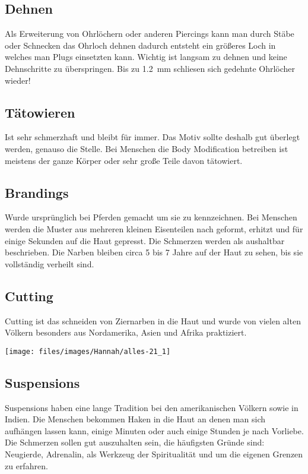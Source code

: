 \subsection{Dehnen}
Als Erweiterung von Ohrlöchern oder anderen Piercings kann man durch Stäbe oder Schnecken das Ohrloch
dehnen dadurch entsteht ein größeres Loch in welches man Plugs einsetzten kann. Wichtig ist langsam
zu dehnen und keine Dehnschritte zu überspringen. Bis zu \SI{1,2}{\milli\metre} schliesen sich
gedehnte Ohrlöcher wieder!

\subsection{Tätowieren}
Ist sehr schmerzhaft und bleibt für immer. Das Motiv sollte deshalb gut überlegt werden, genauso die
Stelle. Bei Menschen die Body Modification betreiben ist meistens der ganze Körper oder sehr große
Teile davon tätowiert.

\subsection{Brandings}
Wurde ursprünglich bei Pferden gemacht um sie zu kennzeichnen. Bei Menschen werden die Muster aus
mehreren kleinen Eisenteilen nach geformt, erhitzt und für einige Sekunden auf die Haut gepresst. Die
Schmerzen werden als aushaltbar beschrieben. Die Narben bleiben circa 5 bis 7 Jahre auf der Haut zu
sehen, bis sie vollständig verheilt sind.

\subsection{Cutting}
Cutting ist das schneiden von Ziernarben in die Haut und wurde von vielen alten Völkern besonders aus
Nordamerika, Asien und Afrika praktiziert.

\begin{figurewrapper}
	\texttt{[image: files/images/Hannah/alles-21\_1]}%
\end{figurewrapper}

\subsection{Suspensions}
Suspensions haben eine lange Tradition bei den amerikanischen Völkern sowie in Indien. Die Menschen
bekommen Haken in die Haut an denen man sich aufhängen lassen kann, einige Minuten oder auch einige
Stunden je nach Vorliebe. Die Schmerzen sollen gut auszuhalten sein, die häufigsten Gründe sind:
Neugierde, Adrenalin, als Werkzeug der Spiritualität und um die eigenen Grenzen zu erfahren.

